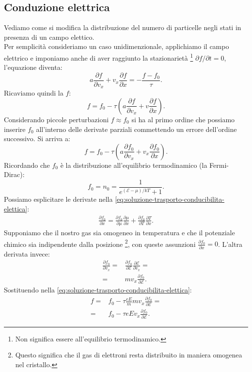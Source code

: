 \subsection{Conduzione elettrica}
\label{subsubsec:Conduzione elettrica}
Vediamo come si modifica la distribuzione del numero di particelle negli stati in presenza di un campo elettico.\\
Per semplicità consideriamo un caso unidimenzionale, applichiamo il campo elettrico e imponiamo anche di aver raggiunto la stazionarietà \footnote{Non significa essere all'equilibrio termodinamico.} $\partial f / \partial t = 0$, l'equazione diventa:
\[
	a \frac{\partial f}{\partial v_x} 
	+ v_x \frac{\partial f}{\partial x} 
	=
	- \frac{f-f_0}{\tau}
.\] 
Ricaviamo quindi la $f$:
\[
	f 
	=
	f_0 - \tau 
	\left( 
	a \frac{\partial f}{\partial v_x} 
	+ 
	v \frac{\partial f}{\partial x}  \right) 
.\]
Considerando piccole perturbazioni $f \approx f_0$ si ha al primo ordine che possiamo inserire $f_0$ all'interno delle derivate parziali commettendo un errore dell'ordine successivo. Si arriva a:
\[
	f 
	=
	f_0 
	- 
	\tau 
	\left( 
	a \frac{\partial f_0}{\partial v_x} 
	+ 
	v_x \frac{\partial f_0}{\partial x}  
	\right) \label{eq:soluzione-trasporto-conducibilita-elettica}
.\] 
Ricordando che $f_0$ è la distribuzione all'equilibrio termodinamico (la Fermi-Dirac):
\[
	f_0
	=
	n_0
	=
	\frac{1}{e^{\left( \mathcal{E} - \mu  \right) /kT}+1}
.\] 
Possiamo esplicitare le derivate nella \ref{eq:soluzione-trasporto-conducibilita-elettica}:
\[\begin{aligned}
	\frac{\partial f_0}{\partial x} 
	=
	\frac{\partial f_0}{\partial \mu } \frac{\partial \mu }{\partial x} 
	+
	\frac{\partial f_0}{\partial T} \frac{\partial T}{\partial x} 
	\label{eq:temperatura-non-omo}
.\end{aligned}\]
Supponiamo che il nostro gas sia omogeneo in temperatura e che il potenziale chimico sia indipendente dalla posizione \footnote{Questo significa che il gas di elettroni resta distribuito in maniera omogenea nel cristallo.}, con queste assunzioni $\frac{\partial f_0}{\partial x} = 0$. 
L'altra derivata invece:
\[\begin{aligned}
	\frac{\partial f_0}{\partial v_x} 
	=&
	\frac{\partial f_0}{\partial \mathcal{E} } 
	\frac{\partial \mathcal{E} }{\partial v_x} 
	= \\
	=& mv_x 
	\frac{\partial f_0}{\partial \mathcal{E} } 
.\end{aligned}\]
Sostituendo nella \ref{eq:soluzione-trasporto-conducibilita-elettica}:
\[\begin{aligned}
	f
	=&
	f_0
	-
	\tau \frac{eE}{m}
	mv_x \frac{\partial f_0}{\partial \mathcal{E} }
	=\\
	=& f_0
	-
	\tau e E v_x
	\frac{\partial f_0}{\partial \mathcal{E} } 
.\end{aligned}\]
